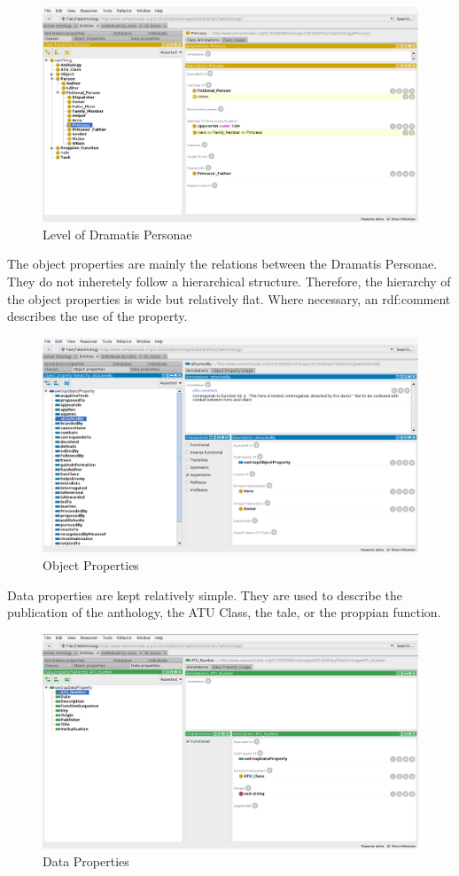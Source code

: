 \documentclass[10pt,a4paper]{article}
\begin{document}
\begin{figure}[H]
\centering
 	\includegraphics[scale=0.25]{Screen3.png}
 	\caption{Level of Dramatis Personae}
\end{figure}

The object properties are mainly the relations between the Dramatis Personae. They do not inheretely follow a hierarchical structure. Therefore, the hierarchy of the object properties is wide but relatively flat. Where necessary, an rdf:comment describes the use of the property. 

\begin{figure}[H]
\centering
 	\includegraphics[scale=0.25]{Screen4.png}
 	\caption{Object Properties}
\end{figure}
\newpage

Data properties are kept relatively simple. They are used to describe the publication of the anthology, the ATU Class, the tale, or the proppian function. 
\begin{figure}[H]
\centering
 	\includegraphics[scale=0.25]{Screen5.png}
 	\caption{Data Properties}
\end{figure}
\end{document}
